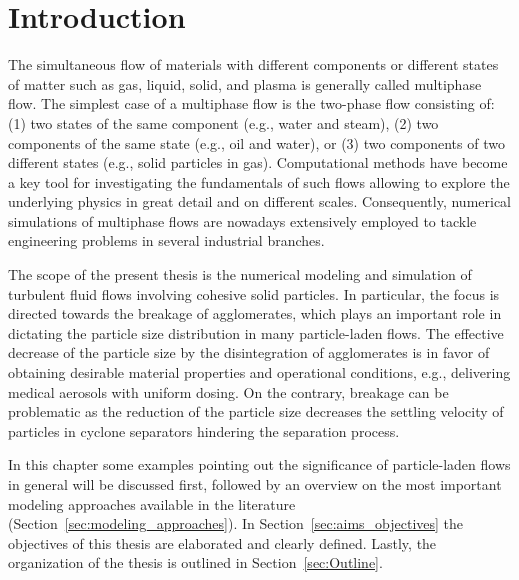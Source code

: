  \chapter{Introduction}
\label{cha:introduction}

The simultaneous flow of materials with different components or
different states of matter such as gas, liquid, solid, and plasma is
generally called multiphase flow.  The simplest case of a multiphase
flow is the two-phase flow consisting of: (1) two states of the same
component (e.g., water and steam), (2) two components of the same
state
(e.g., oil and water), or (3) two components of two different states
(e.g., solid particles in gas). Computational methods have become a
key tool for investigating the fundamentals of such flows allowing to
explore the underlying physics in great detail and on different
scales. Consequently, numerical simulations of multiphase flows are
nowadays extensively employed to tackle engineering problems in
several industrial branches.

The scope of the present thesis is the numerical modeling and
simulation of turbulent fluid flows involving cohesive solid
particles. In particular, the focus is directed towards the breakage
of agglomerates, which plays an important role in dictating the
particle size distribution in many particle-laden flows.  The
effective decrease of the particle size by the disintegration of
agglomerates is in favor of obtaining desirable material properties
and operational conditions, e.g., delivering medical aerosols with
uniform dosing. On the contrary, breakage can be problematic as the
reduction of the particle size decreases the settling velocity of
particles in cyclone separators hindering the separation process.

In this chapter some examples pointing out the significance of
particle-laden flows in general will be discussed first, followed by
an overview on the most important modeling approaches available in the
literature (Section~\ref{sec:modeling_approaches}). In
Section~\ref{sec:aims_objectives} the objectives of this thesis are
elaborated and clearly defined. Lastly, the organization of the thesis
is outlined in Section~\ref{sec:Outline}.

